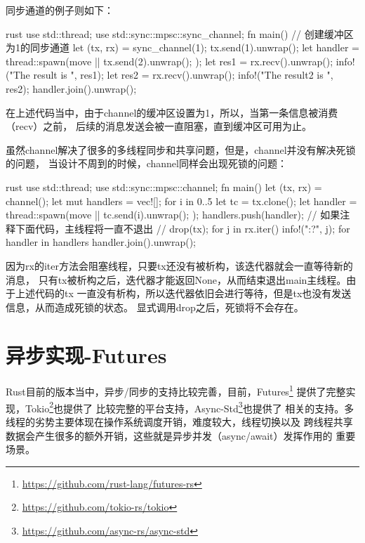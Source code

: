 同步通道的例子则如下：
\begin{code-block}{rust}
use std::thread;
use std::sync::mpsc::sync_channel;
fn main() {
    // 创建缓冲区为1的同步通道
    let (tx, rx) = sync_channel(1);
    tx.send(1).unwrap();
    let handler = thread::spawn(move || {
        tx.send(2).unwrap();
    });
    let res1 = rx.recv().unwrap();
    info!("The result is {}", res1);
    let res2 = rx.recv().unwrap();
    info!("The result2 is {}", res2);
    handler.join().unwrap();
}
\end{code-block}
在上述代码当中，由于channel的缓冲区设置为1，所以，当第一条信息被消费（recv）之前，
后续的消息发送会被一直阻塞，直到缓冲区可用为止。

虽然channel解决了很多的多线程同步和共享问题，但是，channel并没有解决死锁的问题，
当设计不周到的时候，channel同样会出现死锁的问题：
\begin{code-block}{rust}
use std::thread;
use std::sync::mpsc::channel;
fn main() {
    let (tx, rx) = channel();
    let mut handlers = vec![];
    for i in 0..5 {
        let tc = tx.clone();
        let handler = thread::spawn(move || {
            tc.send(i).unwrap();
        });
        handlers.push(handler);
    }
    // 如果注释下面代码，主线程将一直不退出
    // drop(tx);
    for j in rx.iter() {
        info!("{:?}", j);
    }
    for handler in handlers {
        handler.join().unwrap();
    }
}
\end{code-block}
因为rx的iter方法会阻塞线程，只要tx还没有被析构，该迭代器就会一直等待新的消息，
只有tx被析构之后，迭代器才能返回None，从而结束退出main主线程。由于上述代码的tx
一直没有析构，所以迭代器依旧会进行等待，但是tx也没有发送信息，从而造成死锁的状态。
显式调用drop之后，死锁将不会存在。

\section{异步实现-Futures}
Rust目前的版本当中，异步/同步的支持比较完善，目前，Futures\footnote{\url{https://github.com/rust-lang/futures-rs}}
提供了完整实现，Tokio\footnote{\url{https://github.com/tokio-rs/tokio}}也提供了
比较完整的平台支持，Async-Std\footnote{\url{https://github.com/async-rs/async-std}}也提供了
相关的支持。多线程的劣势主要体现在操作系统调度开销，难度较大，线程切换以及
跨线程共享数据会产生很多的额外开销，这些就是异步并发（async/await）发挥作用的
重要场景。

